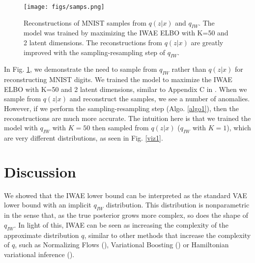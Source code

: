 \documentclass{article} %
\begin{document}
\begin{figure}[h]
  \centering
      \texttt{[image: figs/samps.png]}
  \caption{Reconstructions of MNIST samples from $q(z|x)$ and $q_{IW}$. The model was trained by maximizing the IWAE ELBO with K=50 and 2 latent dimensions. The reconstructions from $q(z|x)$ are greatly improved with the sampling-resampling step of $q_{IW}$.}
  \label{recon}
\end{figure}

In Fig. \ref{recon}, we demonstrate the need to sample from $q_{IW}$ rather than $q(z|x)$ for reconstructing MNIST digits. We trained the model to maximize the IWAE ELBO with K=50 and 2 latent dimensions, similar to Appendix C in \cite{burda2015importance}. When we sample from $q(z|x)$ and reconstruct the samples, we see a number of anomalies. However, if we perform the sampling-resampling step (Algo. \ref{algo1}), then the reconstructions are much more accurate. The intuition here is that we trained the model with $q_{IW}$ with $K=50$ then sampled from $q(z|x)$ ($q_{IW}$ with $K=1$), which are very different distributions, as seen in Fig. \ref{viz1}.



\section{Discussion}

We showed that the IWAE lower bound can be interpreted as the standard VAE lower bound with an implicit $q_{IW}$ distribution.
This distribution is nonparametric in the sense that, as the true posterior grows more complex, so does the shape of $q_{IW}$.
In light of this, IWAE can be seen as increasing the complexity of the approximate distribution $q$, similar to other methods that increase the complexity of $q$, such as Normalizing Flows (\cite{normflow}), Variational Boosting (\cite{varboosting}) or Hamiltonian variational inference (\cite{salimans2015markov}). %

 












\end{document}
